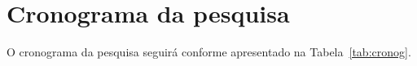 \section{Cronograma da pesquisa} \label{sec:cronog}
    O cronograma da pesquisa seguirá conforme apresentado na Tabela~\ref{tab:cronog}.

    
    